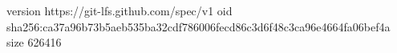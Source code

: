version https://git-lfs.github.com/spec/v1
oid sha256:ca37a96b73b5aeb535ba32cdf786006fecd86c3d6f48c3ca96e4664fa06bef4a
size 626416
